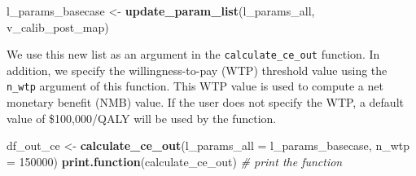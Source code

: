\documentclass[]{book}
\newenvironment{Shaded}{\begin{snugshade}}{\end{snugshade}}
\newcommand{\CommentTok}[1]{\textcolor[rgb]{0.56,0.35,0.01}{\textit{#1}}}
\newcommand{\DataTypeTok}[1]{\textcolor[rgb]{0.13,0.29,0.53}{#1}}
\newcommand{\DecValTok}[1]{\textcolor[rgb]{0.00,0.00,0.81}{#1}}
\newcommand{\KeywordTok}[1]{\textcolor[rgb]{0.13,0.29,0.53}{\textbf{#1}}}
\newcommand{\NormalTok}[1]{#1}
\newcommand{\StringTok}[1]{\textcolor[rgb]{0.31,0.60,0.02}{#1}}
\begin{document}
\begin{Shaded}
\begin{Highlighting}[]
\NormalTok{l_params_basecase <-}\StringTok{ }\KeywordTok{update_param_list}\NormalTok{(l_params_all, v_calib_post_map) }
\end{Highlighting}
\end{Shaded}

We use this new list as an argument in the \texttt{calculate\_ce\_out} function. In addition, we specify the willingness-to-pay (WTP) threshold value using the \texttt{n\_wtp} argument of this function. This WTP value is used to compute a net monetary benefit (NMB) value. If the user does not specify the WTP, a default value of \$100,000/QALY will be used by the function.

\begin{Shaded}
\begin{Highlighting}[]
\NormalTok{df_out_ce <-}\StringTok{ }\KeywordTok{calculate_ce_out}\NormalTok{(}\DataTypeTok{l_params_all =}\NormalTok{ l_params_basecase, }
                                \DataTypeTok{n_wtp =} \DecValTok{150000}\NormalTok{)}
\KeywordTok{print.function}\NormalTok{(calculate_ce_out) }\CommentTok{# print the function}
\end{Highlighting}
\end{Shaded}
\end{document}
